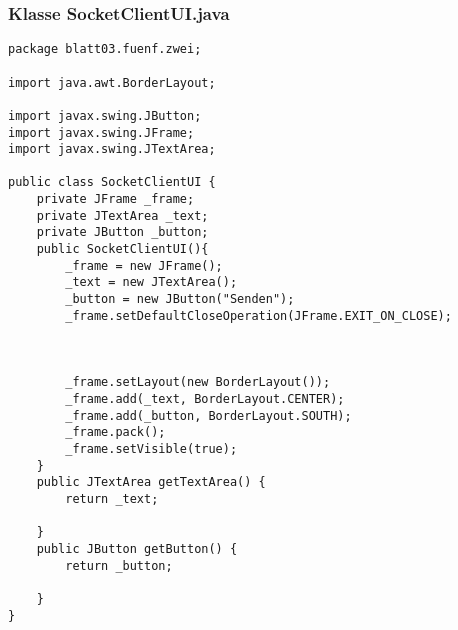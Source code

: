 \documentclass[twoside]{article}
\begin{document}
\subsubsection*{Klasse SocketClientUI.java}
\begin{lstlisting}
package blatt03.fuenf.zwei;

import java.awt.BorderLayout;

import javax.swing.JButton;
import javax.swing.JFrame;
import javax.swing.JTextArea;

public class SocketClientUI {
	private JFrame _frame;
	private JTextArea _text;
	private JButton _button;
	public SocketClientUI(){
		_frame = new JFrame();
		_text = new JTextArea();
		_button = new JButton("Senden");
		_frame.setDefaultCloseOperation(JFrame.EXIT_ON_CLOSE);
		
		
		
		_frame.setLayout(new BorderLayout());
		_frame.add(_text, BorderLayout.CENTER);
		_frame.add(_button, BorderLayout.SOUTH);
		_frame.pack();
		_frame.setVisible(true);
	}
	public JTextArea getTextArea() {
		return _text;
		
	}
	public JButton getButton() {
		return _button;
		
	}
}
\end{lstlisting}
\end{document}
